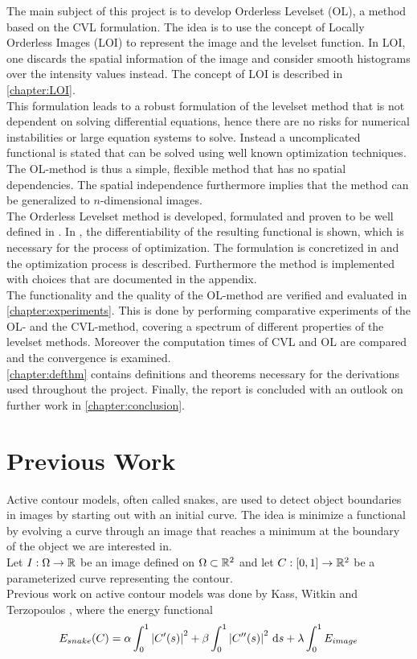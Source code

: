 The main subject of this project is to develop Orderless Levelset (OL), a method based on the CVL formulation. The idea is to use the concept of Locally Orderless Images (LOI) to represent the image and the levelset function. In LOI, one discards the spatial information of the image and consider smooth histograms over the intensity values instead. The concept of LOI is described in \cref{chapter:LOI}.\\
This formulation leads to a robust formulation of the levelset method that is not dependent on solving differential equations, hence there are no risks for numerical instabilities or large equation systems to solve. Instead a uncomplicated functional is stated that can be solved using well known optimization techniques. The OL-method is thus a simple, flexible method that has no spatial dependencies. The spatial independence furthermore implies that the method can be generalized to $n$-dimensional images.\\
The Orderless Levelset method is developed, formulated and proven to be well defined in . In , the differentiability of the resulting functional is shown, which is necessary for the process of optimization. The formulation is concretized in  and the optimization process is described. Furthermore the method is implemented with choices that are documented in the appendix.\\

The functionality and the quality of the OL-method are verified and evaluated in \cref{chapter:experiments}. This is done by performing comparative experiments of the OL- and the CVL-method, covering a spectrum of different properties of the levelset methods. Moreover the computation times of CVL and OL are compared and the convergence is examined.\\
\cref{chapter:defthm} contains definitions and theorems necessary for the derivations used throughout the project. Finally, the report is concluded with an outlook on further work in \cref{chapter:conclusion}.

\section{Previous Work}

Active contour models, often called snakes, are used to detect object boundaries in images by starting out with an initial curve. The idea is minimize a functional by evolving a curve through an image that reaches a minimum at the boundary of the object we are interested in.\\
Let $I:\Omega\to \mathbb R$ be an image defined on $\Omega\subset\mathbb R^2$ and let $C:[0,1]\to\mathbb R^2$ be a parameterized curve representing the contour.\\
Previous work on active contour models was done by Kass, Witkin and Terzopoulos \cite{kass.88}, where the energy functional
\begin{equation}
  E_{snake}(C) = \alpha\int_0^1 \left| {C'(s)} \right|^2  + \beta\int_0^1 \left| {C''(s)} \right|^2\,{\rm d} s + \lambda\int_0^1 E_{image}
\end{equation}


